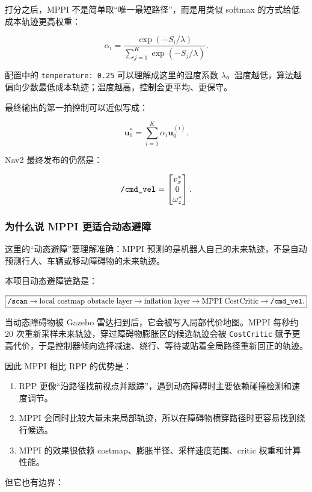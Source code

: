 \documentclass[UTF8,11pt,a4paper]{ctexart}
\newcommand{\bs}[1]{\bm{#1}}
\begin{document}
打分之后，MPPI 不是简单取“唯一最短路径”，而是用类似 softmax 的方式给低成本轨迹更高权重：

\[
\boxed{
\alpha_i
=
\frac{
\exp\left(-S_i/\lambda\right)
}{
\sum_{j=1}^{K}\exp\left(-S_j/\lambda\right)
}.
}
\]

配置中的 \texttt{temperature: 0.25} 可以理解成这里的温度系数 \(\lambda\)。温度越低，算法越偏向少数最低成本轨迹；温度越高，控制会更平均、更保守。

最终输出的第一拍控制可以近似写成：

\[
\boxed{
\bs u_0^\ast
=
\sum_{i=1}^{K}
\alpha_i \bs u_0^{(i)}.
}
\]

Nav2 最终发布的仍然是：

\[
\text{\texttt{/cmd\_vel}}
=
\begin{bmatrix}
v_x^\ast\\
0\\
\omega_z^\ast
\end{bmatrix}.
\]

\subsubsection{为什么说 MPPI 更适合动态避障}

这里的“动态避障”要理解准确：MPPI 预测的是机器人自己的未来轨迹，不是自动预测行人、车辆或移动障碍物的未来轨迹。

本项目动态避障链路是：

\[
\boxed{
\text{\texttt{/scan}}
\rightarrow
\text{local costmap obstacle layer}
\rightarrow
\text{inflation layer}
\rightarrow
\text{MPPI CostCritic}
\rightarrow
\text{\texttt{/cmd\_vel}}.
}
\]

当动态障碍物被 Gazebo 雷达扫到后，它会被写入局部代价地图。MPPI 每秒约 \(20\) 次重新采样未来轨迹，穿过障碍物膨胀区的候选轨迹会被 \texttt{CostCritic} 赋予更高代价，于是控制器倾向选择减速、绕行、等待或贴着全局路径重新回正的轨迹。

因此 MPPI 相比 RPP 的优势是：

\begin{enumerate}
  \item RPP 更像“沿路径找前视点并跟踪”，遇到动态障碍时主要依赖碰撞检测和速度调节。
  \item MPPI 会同时比较大量未来局部轨迹，所以在障碍物横穿路径时更容易找到绕行候选。
  \item MPPI 的效果很依赖 costmap、膨胀半径、采样速度范围、critic 权重和计算性能。
\end{enumerate}

但它也有边界：
\end{document}
